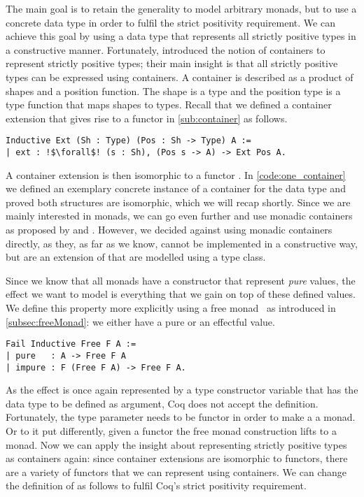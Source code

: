 The main goal is to retain the generality to model arbitrary monads, but to use a concrete data type in order to fulfil the strict positivity requirement.
We can achieve this goal by using a data type that represents all strictly positive types in a constructive manner.
Fortunately, \citet{abbott2003categories} introduced the notion of containers to represent strictly positive types; their main insight is that all strictly positive types can be expressed using containers.
A container is described as a product of shapes and a position function.
The shape is a type  and the position type  is a type function that maps shapes to types.
Recall that we defined a container extension that gives rise to a functor in \autoref{sub:container} as follows.

\begin{verbatim}
Inductive Ext (Sh : Type) (Pos : Sh -> Type) A :=
| ext : !$\forall$! (s : Sh), (Pos s -> A) -> Ext Pos A.
\end{verbatim}

A container extension  is then isomorphic to a functor .
In \autoref{code:one_container} we defined an exemplary concrete instance of a container for the data type  and proved both structures are isomorphic, which we will recap shortly.
Since we are mainly interested in monads, we can go even further and use monadic containers as proposed by \citet{altenkirch2017monadic} and \citet{uustalu2017partiality}.
However, we decided against using monadic containers directly, as they, as far as we know, cannot be implemented in a constructive way, but are an extension of  that are modelled using a type class.

Since we know that all monads have a constructor that represent \emph{pure} values, the effect we want to model is everything that we gain on top of these defined values.
We define this property more explicitly using a free monad~\citep{swierstra2008data} as introduced in \autoref{subsec:freeMonad}: we either have a pure or an effectful value.

\begin{verbatim}
Fail Inductive Free F A :=
| pure   : A -> Free F A
| impure : F (Free F A) -> Free F A.
\end{verbatim}

As the effect is once again represented by a type constructor variable  that has the data type to be defined as argument, Coq does not accept the definition.
Fortunately, the type parameter  needs to be functor in order to make a  a monad.
Or to it put differently, given a functor  the free monad construction lifts  to a monad.
Now we can apply the insight about representing strictly positive types as containers again: since container extensions are isomorphic to functors, there are a variety of functors that we can represent using containers.
We can change the definition of  as follows to fulfil Coq's strict positivity requirement.

